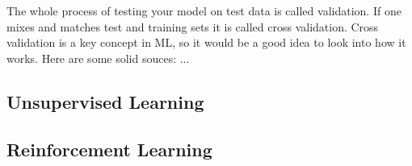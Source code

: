 \documentclass[12pt, letterpaper, twoside]{article}
\begin{document}
The whole process of testing your model on test data is called validation. If one mixes and matches test and training sets it is called cross validation. Cross validation is a key concept in ML, so it would be a good idea to look into how it works. Here are some solid souces: ...


\subsection{Unsupervised Learning}

\subsection{Reinforcement Learning}
\end{document}
